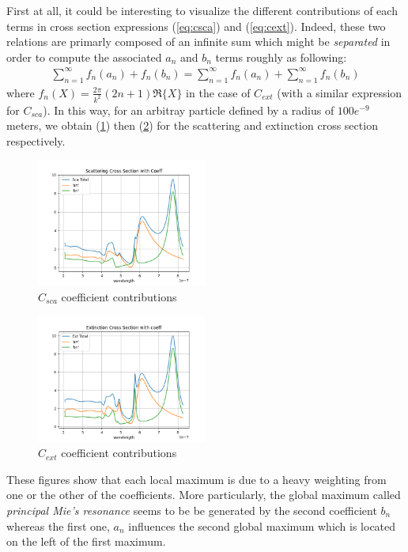 \documentclass{article}
\numberwithin{equation}{section}
\begin{document}
First at all, it could be interesting to visualize the different contributions of each terms in cross section expressions (\ref{eq:csca}) and (\ref{eq:cext}). Indeed, these two relations are primarly composed of an infinite sum which might be \textit{separated} in order to compute the associated $a_{n}$ and $b_{n}$ terms roughly as following:
\begin{align}
\sum_{n=1}^{\infty } f_{n}(a_{n}) + f_{n}(b_{n}) = \sum_{n=1}^{\infty } f_{n}(a_{n}) + \sum_{n=1}^{\infty } f_{n}(b_{n})
\end{align}
where $f_{n}(X) = \frac{2\pi}{k^{2}}(2n+1)\Re\{X\}$ in the case of $C_{ext}$ (with a similar expression for $C_{sca}$). In this way, for an arbitray particle defined by a radius of $100e^{-9}$ meters, we obtain (\ref{fig:sca_coeff}) then (\ref{fig:ext_coeff}) for the scattering and extinction cross section respectively.
\begin{figure}[h]
    \centering
    \includegraphics[width=0.5\textwidth, height=0.4\textwidth]{sca_coeff.png}
    \caption{$C_{sca}$ coefficient contributions}
    \label{fig:sca_coeff}
\end{figure}
\begin{figure}[h]
    \centering
    \includegraphics[width=0.5\textwidth, height=0.4\textwidth]{ext_coeff.png}
    \caption{$C_{ext}$ coefficient contributions}
    \label{fig:ext_coeff}
\end{figure}
These figures show that each local maximum is due to a heavy weighting from one or the other of the coefficients. More particularly, the global maximum called \textit{principal Mie's resonance} seems to be be generated by the second coefficient $b_{n}$ whereas the first one, $a_{n}$ influences the second global maximum which is located on the left of the first maximum.
\end{document}
